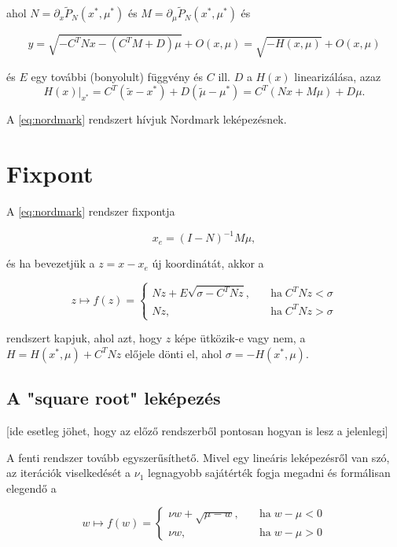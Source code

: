 \noindent ahol $N=\partial_x \tilde{P}_N(x^*,\mu^*)$ és $M=\partial_\mu \tilde{P}_N(x^*,\mu^*)$ és 

\begin{equation}
y=\sqrt{-C^TNx-(C^T M+D)\mu}+O(x,\mu)=\sqrt{-H(x,\mu)}+O(x,\mu)
\end{equation}

\noindent és $E$ egy további (bonyolult) függvény és $C$ ill. $D$ a $H(x)$ linearizálása, azaz 
\begin{equation}
\left.H(x)\right|_{x^*}=C^T(\tilde{x}-x^*)+D(\tilde{\mu}-\mu^*)=C^T (Nx+M\mu)+D \mu.
\end{equation}

\noindent A \eqref{eq:nordmark} rendszert hívjuk Nordmark leképezésnek.

\section{Fixpont}

A \eqref{eq:nordmark} rendszer fixpontja

\begin{equation}
x_e=(I-N)^{-1}M \mu,
\end{equation}

\noindent és ha bevezetjük a $z=x-x_e$ új koordinátát, akkor a

\begin{equation}
z \mapsto f(z)=\begin{cases}
Nz+E\sqrt{\sigma-C^T N z}, \quad &\text{ha} \; C^T N z<\sigma\\
Nz, &\text{ha} \; C^T N z>\sigma
\end{cases}
\end{equation}

\noindent rendszert kapjuk, ahol azt, hogy $z$ képe ütközik-e vagy nem, a $H=H(x^*,\mu)+C^T N z$ előjele dönti el, ahol $\sigma=-H(x^*,\mu)$.

\subsection{A "square root" leképezés}

[ide esetleg jöhet, hogy az előző rendszerből pontosan hogyan is lesz a jelenlegi]

A fenti rendszer tovább egyszerűsíthető. Mivel egy lineáris leképezésről van szó, az iterációk viselkedését a $\nu_1$ legnagyobb sajátérték fogja megadni és formálisan elegendő a

\begin{equation}\label{eq:sr}
w \mapsto f(w)=\begin{cases}
\nu w+\sqrt{\mu-w}, \quad &\text{ha} \; w-\mu<0\\
\nu w, &\text{ha} \; w-\mu>0
\end{cases}
\end{equation}

